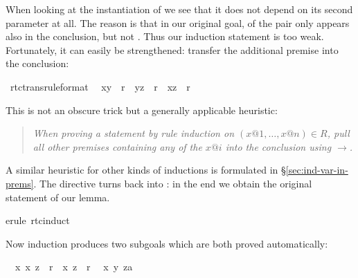 \begin{isabellebody}
\begin{isamarkuptxt}
When looking at the instantiation of  we see that it does not
depend on its second parameter at all. The reason is that in our original
goal, of the pair  only  appears also in the
conclusion, but not . Thus our induction statement is too
weak. Fortunately, it can easily be strengthened:
transfer the additional premise  into the conclusion:%
\end{isamarkuptxt}%
\isamarkuptrue%
\isamarkupfalse%
\ rtc{\isacharunderscore}trans{\isacharbrackleft}rule{\isacharunderscore}format{\isacharbrackright}{\isacharcolon}\isanewline
\ \ {\isachardoublequote}{\isacharparenleft}x{\isacharcomma}y{\isacharparenright}\ {\isasymin}\ r{\isacharasterisk}\ {\isasymLongrightarrow}\ {\isacharparenleft}y{\isacharcomma}z{\isacharparenright}\ {\isasymin}\ r{\isacharasterisk}\ {\isasymlongrightarrow}\ {\isacharparenleft}x{\isacharcomma}z{\isacharparenright}\ {\isasymin}\ r{\isacharasterisk}{\isachardoublequote}\isamarkupfalse%
%
\begin{isamarkuptxt}%
\noindent
This is not an obscure trick but a generally applicable heuristic:
\begin{quote}\em
When proving a statement by rule induction on $(x@1,\dots,x@n) \in R$,
pull all other premises containing any of the $x@i$ into the conclusion
using $\longrightarrow$.
\end{quote}
A similar heuristic for other kinds of inductions is formulated in
\S\ref{sec:ind-var-in-prems}. The  directive turns
\isa{{\isasymlongrightarrow}} back into \isa{{\isasymLongrightarrow}}: in the end we obtain the original
statement of our lemma.%
\end{isamarkuptxt}%
\isamarkuptrue%
erule\ rtc{\isachardot}induct{\isacharparenright}\isamarkupfalse%
%
\begin{isamarkuptxt}%
\noindent
Now induction produces two subgoals which are both proved automatically:
\begin{isabelle}%
\ {}{\isachardot}\ {\isasymAnd}x{\isachardot}\ {\isacharparenleft}x{\isacharcomma}\ z{\isacharparenright}\ {\isasymin}\ r{\isacharasterisk}\ {\isasymlongrightarrow}\ {\isacharparenleft}x{\isacharcomma}\ z{\isacharparenright}\ {\isasymin}\ r{\isacharasterisk}\isanewline
\ {}{\isachardot}\ {\isasymAnd}x\ y\ za{\isachardot}\isanewline

\end{isabelle}
\end{isamarkuptxt}
\end{isabellebody}
